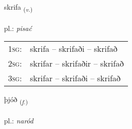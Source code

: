 \documentclass[frontgrid, backgrid]{flacards}\usepackage[]{graphicx}\usepackage[]{xcolor}
\begin{document}
\renewcommand{\flhead}{\vskip5pt \fboxsep=0pt {\small\bfseries\footnotesize Sagnorð | czasownik}}
\renewcommand{\fcfoot}{\vskip5pt \fboxsep=0pt \hspace{2pt}{\small\bfseries\footnotesize 1K}}

\renewcommand{\blhead}{\vskip5pt {\small\bfseries\footnotesize Sagnorð | czasownik }}
\renewcommand{\bcfoot}{\vskip5pt \hspace{2pt}{\small\bfseries\footnotesize 1K}}


{skrifa \small{\textsubscript{(\textit{v.})}} \\[1ex] %
\textphonetic{[skrɪːva]} \\
pl.: \emph{pisać} \\  [2ex]
\renewcommand*{\arraystretch}{0.8}
\begin{tabular}{p{1cm}l}
\textsc{1sg}: & skrifa -- skrifaði -- skrifað \\ 
\textsc{2sg}: & skrifar -- skrifaðir -- skrifað \\ 
\textsc{3sg}: & skrifar -- skrifaði -- skrifað \\ 
\end{tabular}
}

\renewcommand{\flhead}{\vskip5pt \fboxsep=0pt {\small\bfseries\footnotesize Nafnorð | rzeczownik}}
\renewcommand{\fcfoot}{\vskip5pt \fboxsep=0pt \hspace{2pt}{\small\bfseries\footnotesize 1K}}

\renewcommand{\blhead}{\vskip5pt {\small\bfseries\footnotesize Nafnorð | rzeczownik }}
\renewcommand{\bcfoot}{\vskip5pt \hspace{2pt}{\small\bfseries\footnotesize 1K}}


{þjóð \small{\textsubscript{(\textit{f.})}} \\[1ex] %
\textphonetic{[θjouːð]} \\
pl.: \emph{naród} \\  [2ex]
\renewcommand*{\arraystretch}{0.8}
}
\end{document}
